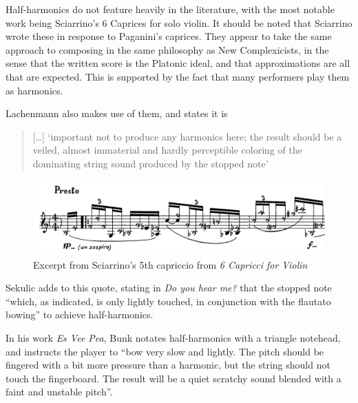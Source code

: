 Half-harmonics do not feature heavily in the literature, with the most notable work being Sciarrino's 6 Caprices for solo violin.\autocite{sciarrinoCapricciViolino1976} 
It should be noted that Sciarrino wrote these in response to Paganini's caprices. 
They appear to take the same approach to composing in the same philosophy as New Complexicists, in the sense that the written score is the Platonic ideal, and that approximations are all that are expected.
This is supported by the fact that many performers play them as harmonics.\autocite[]{appleseedFeedbackExploratorySession2019}


Lachenmann also makes use of them, and states it is
\begin{quotation}
  [\dots] `important not to produce any harmonics here; the result should be a veiled, almost immaterial and hardly perceptible coloring of the dominating string sound produced by the stopped note'\autocite[foreword]{lachenmannMusikFurStreichquartett1972}
\end{quotation}

\begin{figure}
  \includegraphics[width=\linewidth]{./resources/sciarrinoHalfHarmonicNotation.pdf}
  \caption{Excerpt from Sciarrino's 5th capriccio from \emph{6 Capricci for Violin}}\label{fig:sciarrinoExcerpt}\end{figure}

Sekulic adds to this quote, stating in \emph{Do you hear me?} that the stopped note ``which, as indicated, is only lightly touched, in conjunction with the flautato bowing'' to achieve half-harmonics.\autocite[28]{sekulicYouHearMe2012}

In his work \emph{Es Vee Pea}, Bunk notates half-harmonics with a triangle notehead, and instructs the player to ``bow very slow and lightly. The pitch should be fingered with a bit more pressure than a harmonic, but the string should not touch the fingerboard. 
  The result will be a quiet scratchy sound blended with a faint and unstable pitch''.\autocite[]{bunkEsVeePea2002}

